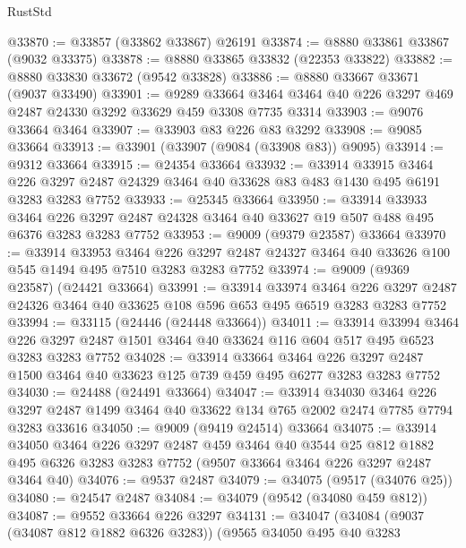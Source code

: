 \begin{lexlean}{RustStd}
\begin{coremodule}
@33870 := @33857 (@33862 @33867) @26191
@33874 := @8880 @33861 @33867 (@9032 @33375)
@33878 := @8880 @33865 @33832 (@22353 @33822)
@33882 := @8880 @33830 @33672 (@9542 @33828)
@33886 := @8880 @33667 @33671 (@9037 @33490)
@33901 := @9289
    @33664
    @3464
    @3464
    @40
    @226
    @3297
    @469
    @2487
    @24330
    @3292
    @33629
    @459
    @3308
    @7735
    @3314
@33903 := @9076 @33664 @3464
@33907 := @33903 @83 @226 @83 @3292
@33908 := @9085 @33664
@33913 := @33901 (@33907 (@9084 (@33908 @83)) @9095)
@33914 := @9312 @33664
@33915 := @24354 @33664
@33932 := @33914
    @33915
    @3464
    @226
    @3297
    @2487
    @24329
    @3464
    @40
    @33628
    @83
    @483
    @1430
    @495
    @6191
    @3283
    @3283
    @7752
@33933 := @25345 @33664
@33950 := @33914
    @33933
    @3464
    @226
    @3297
    @2487
    @24328
    @3464
    @40
    @33627
    @19
    @507
    @488
    @495
    @6376
    @3283
    @3283
    @7752
@33953 := @9009 (@9379 @23587) @33664
@33970 := @33914
    @33953
    @3464
    @226
    @3297
    @2487
    @24327
    @3464
    @40
    @33626
    @100
    @545
    @1494
    @495
    @7510
    @3283
    @3283
    @7752
@33974 := @9009 (@9369 @23587) (@24421 @33664)
@33991 := @33914
    @33974
    @3464
    @226
    @3297
    @2487
    @24326
    @3464
    @40
    @33625
    @108
    @596
    @653
    @495
    @6519
    @3283
    @3283
    @7752
@33994 := @33115 (@24446 (@24448 @33664))
@34011 := @33914
    @33994
    @3464
    @226
    @3297
    @2487
    @1501
    @3464
    @40
    @33624
    @116
    @604
    @517
    @495
    @6523
    @3283
    @3283
    @7752
@34028 := @33914
    @33664
    @3464
    @226
    @3297
    @2487
    @1500
    @3464
    @40
    @33623
    @125
    @739
    @459
    @495
    @6277
    @3283
    @3283
    @7752
@34030 := @24488 (@24491 @33664)
@34047 := @33914
    @34030
    @3464
    @226
    @3297
    @2487
    @1499
    @3464
    @40
    @33622
    @134
    @765
    @2002
    @2474
    @7785
    @7794
    @3283
    @33616
@34050 := @9009 (@9419 @24514) @33664
@34075 := @33914
    @34050
    @3464
    @226
    @3297
    @2487
    @459
    @3464
    @40
    @3544
    @25
    @812
    @1882
    @495
    @6326
    @3283
    @3283
    @7752
    (@9507 @33664 @3464 @226 @3297 @2487 @3464 @40)
@34076 := @9537 @2487
@34079 := @34075 (@9517 (@34076 @25))
@34080 := @24547 @2487
@34084 := @34079 (@9542 (@34080 @459 @812))
@34087 := @9552 @33664 @226 @3297
@34131 := @34047
    (@34084
      (@9037 (@34087 @812 @1882 @6326 @3283))
      (@9565
        @34050
        @495
        @40
        @3283

\end{coremodule}
\end{lexlean}
